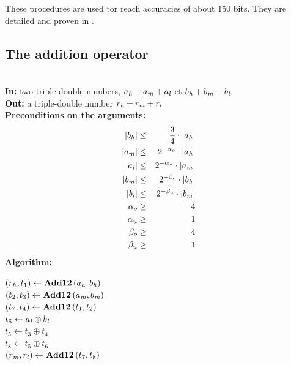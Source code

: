 These procedures are used tor reach accuracies of about 150 bits. They
are detailed and proven in \cite{Lau05}.

\subsection{The addition operator \AddTT}
\begin{algorithm}[\AddTT] \label{addTTref} ~ \\
{\bf In:} two triple-double numbers, $a_{\mathit{h}} + a_{\mathit{m}} + a_{\mathit{l}}$ et $b_{\mathit{h}} + b_{\mathit{m}} + b_{\mathit{l}}$ \\
{\bf Out:} a triple-double number $r_{\mathit{h}} + r_{\mathit{m}} + r_{\mathit{l}}$ \\
{\bf Preconditions on the arguments:}
\begin{eqnarray*}
\left \vert b_{\mathit{h}} \right \vert & \leq & \frac{3}{4} \cdot \left \vert a_{\mathit{h}} \right \vert \\
\left \vert a_{\mathit{m}} \right \vert & \leq & 2^{-\alpha_o} \cdot \left \vert a_{\mathit{h}} \right \vert \\
\left \vert a_{\mathit{l}} \right \vert & \leq & 2^{-\alpha_u} \cdot \left \vert a_{\mathit{m}} \right \vert \\
\left \vert b_{\mathit{m}} \right \vert & \leq & 2^{-\beta_o} \cdot \left \vert b_{\mathit{h}} \right \vert \\
\left \vert b_{\mathit{l}} \right \vert & \leq & 2^{-\beta_u} \cdot \left \vert b_{\mathit{m}} \right \vert \\
\alpha_o & \geq & 4 \\
\alpha_u & \geq & 1 \\
\beta_o & \geq & 4 \\
\beta_u & \geq & 1 \\
\end{eqnarray*}
{\bf Algorithm:} \\
\begin{center}
\begin{minipage}[b]{50mm}
$\left(r_{\mathit{h}}, t_1 \right) \gets \mathbf{Add12}\left( a_{\mathit{h}}, b_{\mathit{h}} \right)$ \\
$\left(t_2, t_3 \right) \gets \mathbf{Add12}\left( a_{\mathit{m}}, b_{\mathit{m}} \right)$ \\
$\left(t_7, t_4 \right) \gets \mathbf{Add12}\left( t_1, t_2 \right)$ \\
$t_6 \gets a_{\mathit{l}} \oplus b_{\mathit{l}}$ \\
$t_5 \gets t_3 \oplus t_4$ \\
$t_8 \gets t_5 \oplus t_6$ \\
$\left( r_{\mathit{m}}, r_{\mathit{l}} \right) \gets \mathbf{Add12}\left( t_7, t_8 \right)$
\end{minipage}
\end{center}
\end{algorithm}

